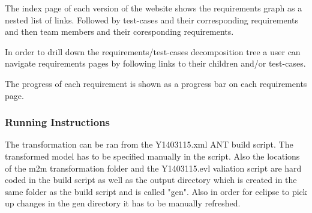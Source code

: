 \documentclass[11pt,a4paper]{article}
\begin{document}
	The index page of each version of the website shows the requirements graph as a nested list of links. Followed by test-cases and their corresponding requirements and then team members and their coresponding requirements. 
	
	In order to drill down the requirements/test-cases decomposition tree a user can navigate requirements pages by following links to their children and/or test-cases. 
	
	The progress of each requirement is shown as a progress bar on each requirements page.

	\subsubsection{Running Instructions}
	The transformation can be ran from the Y1403115.xml ANT build script. The transformed model has to be specified manually in the script. Also the locations of the m2m transformation folder and the Y1403115.evl valiation script are hard coded in the build script as well as the output directory which is created in the same folder as the build script and is called "gen". Also in order for eclipse to pick up changes in the gen directory it has to be manually refreshed.
	
\printbibliography
\end{document}
